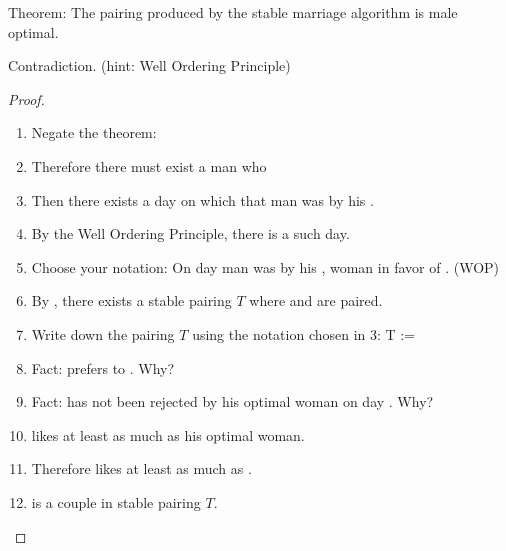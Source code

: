 \question Theorem: The pairing produced by the stable marriage 
algorithm is male optimal.

\begin{solution}[0in]
Contradiction. (hint: Well Ordering Principle)
\begin{proof}  
\begin{enumerate}
\item Negate the theorem:\underline{}\newline \underline{}
\item Therefore there must exist a man who \underline{}
\item Then there exists a day on which that man was 
\underline{}  by his \newline 
\underline{}.
\item By the Well Ordering Principle, there is a \underline{} 
such day.
\item Choose your notation: On day \underline{} man 
\underline{} was \underline{} \newline by 
his \underline{}, woman \underline{} in favor 
of \underline{}. (WOP)
\item By \underline{}, there 
exists a stable pairing $T$ where \underline{} and 
\underline{} are paired.
\item Write down the pairing $T$ using the notation chosen in 3: \newline
	\tab T := \underline{}
\item Fact: \underline{} prefers \underline{} 
to \underline{}. \newline
\tab Why? \underline{}
\item Fact: \underline{} has not been rejected by his 
optimal woman on day \underline{}.\newline
\tab Why? \underline{} \newline \tab \tab \underline{}
\item \underline{} likes \underline{} at least as 
much as his optimal woman.
\item Therefore \underline{} likes \underline{} at 
least as much as \underline{}.
\item \underline{}  is a \underline{}   
couple in stable pairing $T$.

\end{enumerate}
\end{proof} 
\end{solution}

\clearpage
